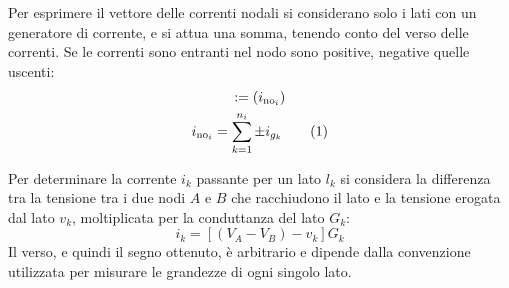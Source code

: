 \documentclass{article}
\newcommand{\tageq}{\tag{\stepcounter{equation}\theequation}}
\numberwithin{equation}{subsection}
\begin{document}
Per esprimere il vettore delle correnti nodali si considerano solo i lati con un generatore di corrente, e si attua una somma, tenendo conto del verso delle correnti. 
Se le correnti sono entranti nel nodo sono positive, negative quelle uscenti: 
\begin{gather*}
    [I_\mathrm{no}]:=(i_{\mathrm{no}_{i}})\\
    i_{\mathrm{no}_i}=\displaystyle\sum_{k=1}^{n_i}\pm i_{g_k}\tageq
\end{gather*}


Per determinare la corrente $i_k$ passante per un lato $l_k$ si considera la differenza tra la tensione tra i due nodi $A$ e $B$ che racchiudono il lato e la tensione erogata dal 
lato $v_k$, moltiplicata per la conduttanza del lato $G_k$:
\begin{equation}
    i_k=[(V_A-V_B)-v_k]G_k
\end{equation}
Il verso, e quindi il segno ottenuto, è arbitrario e dipende dalla convenzione utilizzata per misurare le grandezze di ogni singolo lato. 
\end{document}
